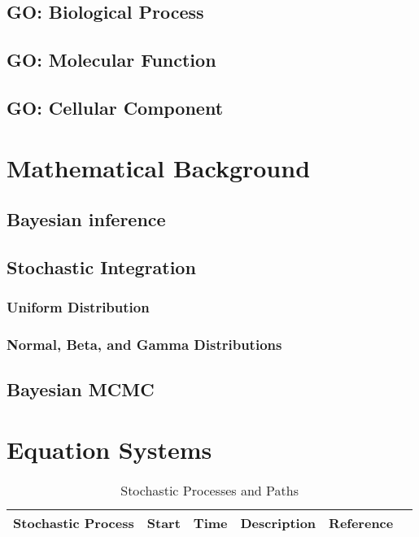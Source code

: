 \subsection{GO: Biological Process}

\subsection{GO: Molecular Function}

\subsection{GO: Cellular Component}

\section{Mathematical Background}

\subsection{Bayesian inference}

\subsection{Stochastic Integration}

\subsubsection{Uniform Distribution}

\subsubsection{Normal, Beta, and Gamma Distributions}

\subsection{Bayesian MCMC}

\section{Equation Systems}

\centering	
\begin{table}[H]\tiny
  \caption{Stochastic Processes and Paths }	
\begin{tabular}{r|p{0.5cm}p{0.5cm}p{2.5cm}|p{1cm}|p{1cm}}
\hline	
Stochastic Process & Start & Time & Description & Reference \\
\hline 
\hline 
\end{tabular}
\end{table}


